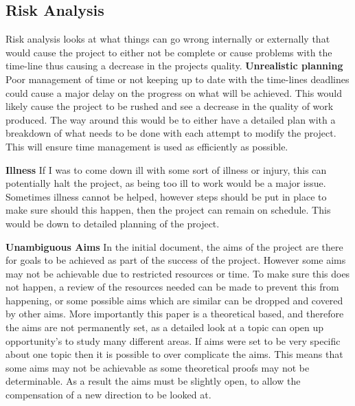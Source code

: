\documentclass[11pt,a4paper]{article}
\begin{document}
\subsection{Risk Analysis}
Risk analysis looks at what things can go wrong internally or externally that would cause the project to either not be complete or cause problems with the time-line thus causing a decrease in the projects quality.
\newline
\newline
\textbf{Unrealistic planning} \newline
Poor management of time or not keeping up to date with the time-lines deadlines could cause a major delay on the progress on what will be achieved. This would likely cause the project to be rushed and see a decrease in the quality of work produced. The way around this would be to either have a detailed plan with a breakdown of what needs to be done with each attempt to modify the project. This will ensure time management is used as efficiently as possible. \newline

\textbf{Illness} \newline
If I was to come down ill with some sort of illness or injury, this can potentially halt the project, as being too ill to work would be a major issue. Sometimes illness cannot be helped, however steps should be put in place to make sure should this happen, then the project can remain on schedule. This would be down to detailed planning of the project.\newline


\textbf{Unambiguous Aims}\newline
In the initial document, the aims of the project are there for goals to be achieved as part of the success of the project. However some aims may not be achievable due to restricted resources or time.
To make sure this does not happen, a review of the resources needed can be made to prevent this from happening, or some possible aims which are similar can be dropped and covered by other aims. More importantly this paper is a theoretical based, and therefore the aims are not permanently set, as a detailed look at a topic can open up opportunity's to study many different areas. If aims were set to be very specific about one topic then it is possible to over complicate the aims. This means that some aims may not be achievable as some theoretical proofs may not be determinable. As a result the aims must be slightly open, to allow the compensation of a new direction to be looked at.\newline
\end{document}

